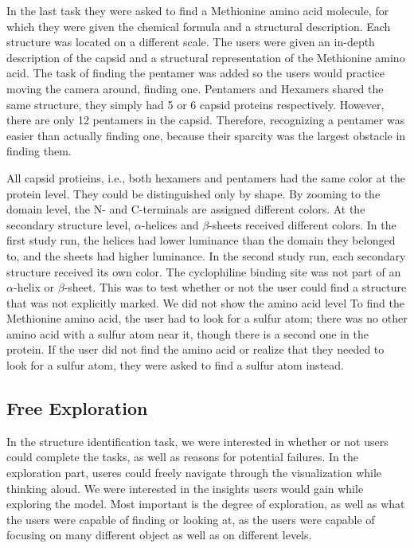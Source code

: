 \documentclass[review,journal]{vgtc}         %
\begin{document}
	In the last task they were asked to find a Methionine amino acid molecule, for which they were given the chemical formula and a structural description.
	Each structure was located on a different scale. 
	The users were given an in-depth description of the capsid and a structural representation of the Methionine amino acid. 
	The task of finding the pentamer was added so the users would practice moving the camera around,  finding one. 
	Pentamers and Hexamers shared the same structure, they simply had 5 or 6 capsid proteins respectively. 
	However, there are only 12 pentamers in the capsid.
	Therefore, recognizing a pentamer was easier than actually finding one, because their sparcity was the largest obstacle in finding them.
	
	All capsid protieins, i.e., both hexamers and pentamers had the same color at the protein level. They could be distinguished only by shape. By zooming to the domain level, the N- and C-terminals are assigned different colors. At the secondary structure level, $\alpha$-helices and $\beta$-sheets received different colors. In the first study run, the helices had lower luminance than the domain they belonged to, and the sheets had higher luminance. In the second study run, each secondary structure received its own color. 
	The cyclophiline binding site was not part of an $\alpha$-helix or $\beta$-sheet.
	This was to test whether or not the user could find a structure that was not explicitly marked. 
	We did not show the amino acid level
	To find the Methionine amino acid, the user had to look for a sulfur atom; there was no other amino acid with a sulfur atom near it, though there is a second one in the protein. 
	If the user did not find the amino acid or realize that they needed to look for a sulfur atom, they were asked to find a sulfur atom instead.
	
	
	
	
	
	\subsection{Free Exploration}
	In the structure identification task, we were interested in whether or not users could complete the tasks, as well as reasons for potential failures. 
	In the exploration part, useres could freely navigate through the visualization while thinking aloud. We were interested in the insights users would gain while exploring the model.
	Most important is the degree of exploration, as well as what the users were capable of finding or looking at, as the users were capable of focusing on many different object as well as on different levels.
	
\end{document}
